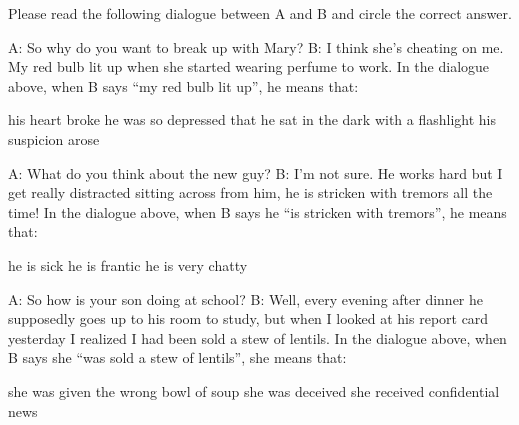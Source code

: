 \documentclass[output=paper]{langsci/langscibook}
\begin{document}
\begin{subappendices}
{\noindent Please read the following dialogue between A and B and circle the correct answer.
\begin{exe}
    \begin{xlist}
    \sn A: So why do you want to break up with Mary?
    \sn B: I think she's cheating on me. My red bulb lit up when she started wearing perfume to work.
    \sn In the dialogue above, when B says \enquote{my red bulb lit up}, he means that:
    \begin{xlist}
         his heart broke
         he was so depressed that he sat in the dark with a flashlight
         his suspicion arose
    \end{xlist}
    \end{xlist}
    \begin{xlist}
        \sn A: What do you think about the new guy?
        \sn B: I'm not sure. He works hard but I get really distracted sitting across from him, he is stricken with tremors all the time!
        \sn In the dialogue above, when B says he \enquote{is stricken with tremors}, he means that:
        \begin{xlist}
         he is sick
         he is frantic
         he is very chatty
        \end{xlist}
        \end{xlist}
        \begin{xlist}
        \sn A: So how is your son doing at school?
        \sn B: Well, every evening after dinner he supposedly goes up to his room to study, but when I looked at his report card yesterday I realized I had been sold a stew of lentils.
        \sn In the dialogue above, when B says she \enquote{was sold a stew of lentils}, she means that:
        \begin{xlist}
         she was given the wrong bowl of soup
         she was deceived
         she received confidential news
        \end{xlist}
        \end{xlist}

\end{exe}}
\end{subappendices}
\end{document}
